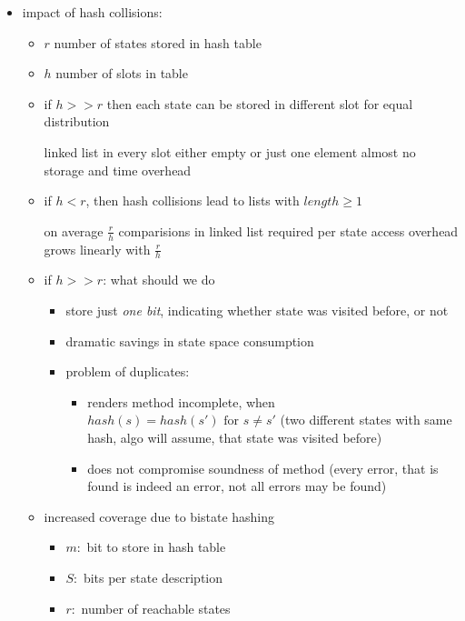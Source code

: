\documentclass[a4paper, 10pt]{article}
\begin{document}
\begin{itemize}
    \item impact of hash collisions:
    \begin{itemize}
        \item $r$ number of states stored in hash table
        \item $h$ number of slots in table
        \item if $h>>r$ then each state can be stored in different slot for equal distribution
        \begin{itemize}
            \fitem linked list in every slot either empty or just one element
            \fitem almost no storage and time overhead
        \end{itemize}
        \item if $h<r$, then hash collisions lead to lists with $length\geq1$
        \begin{itemize}
            \fitem on average $\frac{r}{h}$ comparisions in linked list required per state access
            \fitem overhead grows linearly with $\frac{r}{h}$
        \end{itemize}
        \item if $h>>r$: what should we do
        \begin{itemize}
            \item store just \emph{one bit}, indicating whether state was visited before, or not
            \item dramatic savings in state space consumption
            \item problem of duplicates:
            \begin{itemize}
                \item renders method incomplete, when $hash(s)=hash(s')\textrm{ for } s\not=s'$ {\tiny (two different states with same hash, algo will assume, that state was visited before)}
                \item does not compromise soundness of method {\tiny (every error, that is found is indeed an error, not all errors may be found)}
            \end{itemize}
        \end{itemize}
        \item increased coverage due to bistate hashing
        \begin{itemize}
            \item $m:$ bit to store in hash table
            \item $S:$ bits per state description
            \item $r:$ number of reachable states

\end{itemize}
\end{itemize}
\end{itemize}
\end{document}
